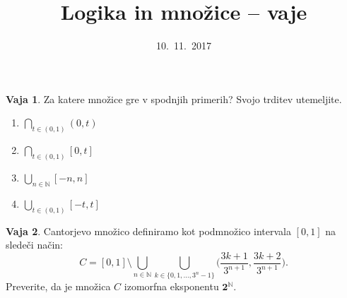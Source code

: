 \documentclass{article}
\newcommand{\two}{\mathbf{2}}
\newcommand{\NN}{\mathbb{N}}
\theoremstyle{definition}
\newtheorem{vaja}{Vaja}
\begin{document}
\title{Logika in množice -- vaje}
\date{10.~11.~2017}
\maketitle

\begin{vaja}
  Za katere množice gre v spodnjih primerih? Svojo trditev utemeljite.
  \begin{enumerate}
    \item
      $\displaystyle{\bigcap_{t \in (0, 1)} (0, t)}$
    \item
      $\displaystyle{\bigcap_{t \in (0, 1)} [0, t]}$
    \item
      $\displaystyle{\bigcup_{n \in \NN} [-n, n]}$
    \item
      $\displaystyle{\bigcup_{t \in (0, 1)} [-t, t]}$
  \end{enumerate}
\end{vaja}

\begin{vaja}
  Cantorjevo množico definiramo kot podmnožico intervala $[0, 1]$ na sledeči način:
  \[C = [0, 1] \setminus \bigcup_{n \in \NN} \bigcup_{k \in \{0, 1,\ldots, 3^n - 1\}} \Big(\frac{3k+1}{3^{n+1}}, \frac{3k+2}{3^{n+1}}\Big).\]
  Preverite, da je množica $C$ izomorfna eksponentu $\two^\NN$.
\end{vaja}
\end{document}
